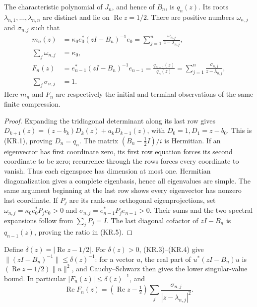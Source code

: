 \begin{lemma}
The characteristic polynomial of \(J_n\), and hence of \(B_n\), is
\(q_n(z)\).  Its roots \(\lambda_{n,1},\ldots,\lambda_{n,n}\)
are distinct and lie on \(\operatorname{Re}z=1/2\).  There are positive
numbers \(\omega_{n,j}\) and \(\sigma_{n,j}\) such that
\[
 \begin{aligned}
 m_n(z)&=\kappa_0e_0^*(zI-B_n)^{-1}e_0
          =\sum_{j=1}^n\frac{\omega_{n,j}}{z-\lambda_{n,j}},\\
 \sum_j\omega_{n,j}&=\kappa_0,\\
 F_n(z)&=e_{n-1}^*(zI-B_n)^{-1}e_{n-1}
          =\frac{q_{n-1}(z)}{q_n(z)}
          =\sum_{j=1}^n\frac{\sigma_{n,j}}{z-\lambda_{n,j}},\\
 \sum_j\sigma_{n,j}&=1.
 \end{aligned}
 \tag{KR.5}
\]
Here \(m_n\) and \(F_n\) are respectively the initial and terminal
observations of the same finite compression.
\end{lemma}

\begin{proof}
Expanding the tridiagonal determinant along its last row gives
\(D_{k+1}(z)=(z-b_k)D_k(z)+a_kD_{k-1}(z)\), with
\(D_0=1,D_1=z-b_0\).  This is (KR.1), proving \(D_n=q_n\).
The matrix \((B_n-\tfrac12I)/i\) is Hermitian.  If an eigenvector
has first coordinate zero, its first row equation forces its second
coordinate to be zero; recurrence through the rows forces every
coordinate to vanish.  Thus each eigenspace has dimension at most
one.  Hermitian diagonalization gives a complete eigenbasis, hence
all eigenvalues are simple.  The same argument beginning at the last
row shows every eigenvector has nonzero last coordinate.
If \(P_j\) are its rank-one orthogonal eigenprojections, set
\(\omega_{n,j}=\kappa_0e_0^*P_je_0>0\) and
\(\sigma_{n,j}=e_{n-1}^*P_je_{n-1}>0\).
Their sums and the two spectral expansions follow from
\(\sum_jP_j=I\).  The last diagonal cofactor of \(zI-B_n\) is
\(q_{n-1}(z)\), proving the ratio in (KR.5).
\end{proof}

Define \(\delta(z)=|\operatorname{Re}z-1/2|\).
For \(\delta(z)>0\), (KR.3)--(KR.4) give
\(\|(zI-B_n)^{-1}\|\leq\delta(z)^{-1}\): for a vector \(u\),
the real part of \(u^*(zI-B_n)u\) is
\((\operatorname{Re}z-1/2)\|u\|^2\), and Cauchy--Schwarz
then gives the lower singular-value bound.  In particular
\(|F_n(z)|\leq\delta(z)^{-1}\), and
\[
 \operatorname{Re}F_n(z)
  =(\operatorname{Re}z-\tfrac12)
          \sum_j\frac{\sigma_{n,j}}{|z-\lambda_{n,j}|^2}. \tag{KR.6}
\]

